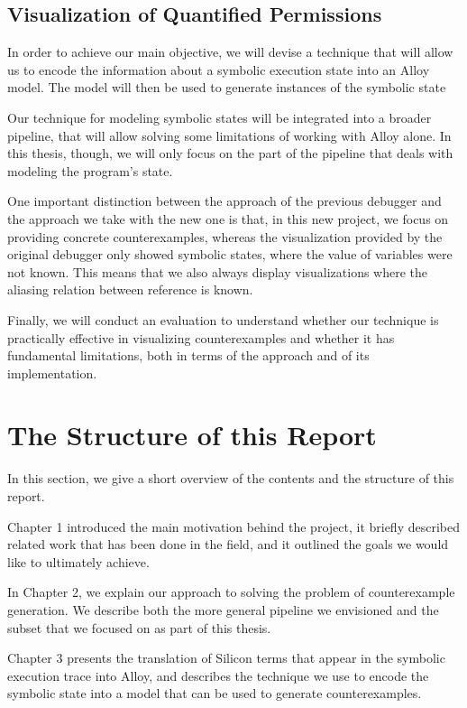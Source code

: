 \subsection{Visualization of Quantified Permissions}\label{visualization-of-quantified-permissions}

In order to achieve our main objective, we will devise a technique that will allow
us to encode the information about a symbolic execution state into an Alloy
model. The model will then be used to generate instances of the symbolic state

Our technique for modeling symbolic states will be integrated into a broader
pipeline, that will allow solving some limitations of working with Alloy alone.
In this thesis, though, we will only focus on the part of the pipeline
that deals with modeling the program's state.

One important distinction between the approach of the previous debugger and the
approach we take with the new one is that, in this new project, we focus on
providing concrete counterexamples, whereas the visualization provided by the
original debugger only showed symbolic states, where the value of variables were
not known. This means that we also always display visualizations where the
aliasing relation between reference is known.

Finally, we will conduct an evaluation to understand whether our technique is
practically effective in visualizing counterexamples and whether it has
fundamental limitations, both in terms of the approach and of its
implementation.


\section{The Structure of this Report}\label{the-structure-of-this-report}

In this section, we give a short overview of the contents and the structure of
this report.

Chapter 1 introduced the main motivation behind the project, it briefly
described related work that has been done in the field, and it outlined the
goals we would like to ultimately achieve.

In Chapter 2, we explain our approach to solving the problem of counterexample
generation. We describe both the more general pipeline we envisioned and the
subset that we focused on as part of this thesis.

Chapter 3 presents the translation of Silicon terms that appear in the symbolic
execution trace into Alloy, and describes the technique we use to encode the
symbolic state into a model that can be used to generate counterexamples.

